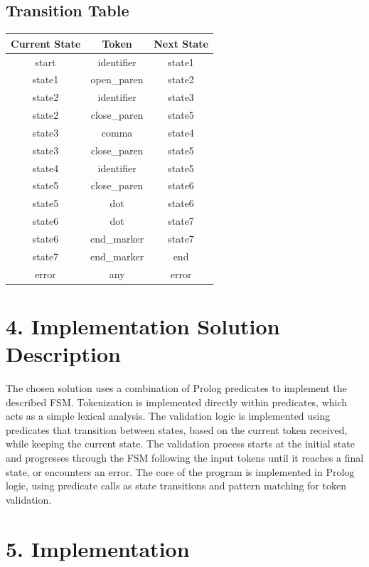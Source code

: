\documentclass{article}
\begin{document}
\subsection*{Transition Table}
\begin{center}
\begin{tabular}{ |c|c|c| } 
 \hline
 Current State & Token & Next State \\
 \hline
 start & identifier & state1 \\ 
 state1 & open\_paren & state2 \\ 
 state2 & identifier & state3 \\
 state2 & close\_paren & state5 \\
 state3 & comma & state4 \\
 state3 & close\_paren & state5 \\
 state4 & identifier & state5 \\
 state5 & close\_paren & state6 \\
 state5 & dot & state6 \\
 state6 & dot & state7 \\
 state6 & end\_marker & state7 \\
 state7 & end\_marker & end \\
 error & any & error \\
 \hline
\end{tabular}
\end{center}
\section*{4. Implementation Solution Description}

The chosen solution uses a combination of Prolog predicates to implement the described FSM. Tokenization is implemented directly within predicates, which acts as a simple lexical analysis. The validation logic is implemented using predicates that transition between states, based on the current token received, while keeping the current state. The validation process starts at the initial state and progresses through the FSM following the input tokens until it reaches a final state, or encounters an error. The core of the program is implemented in Prolog logic, using predicate calls as state transitions and pattern matching for token validation.

\section*{5. Implementation}
\end{document}

